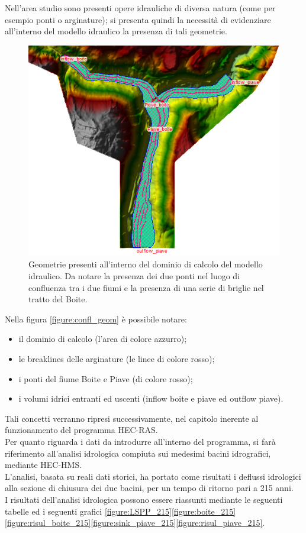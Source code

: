 Nell'area studio sono presenti opere idrauliche di diversa natura (come per esempio ponti o arginature); si presenta quindi la necessità di evidenziare all'interno del modello idraulico la presenza di tali geometrie.

\begin{figure}[H] \centering
\includegraphics[scale=0.7]{immagini/confl_geom.PNG}
\caption{Geometrie presenti all'interno del dominio di calcolo del modello idraulico. Da notare la presenza dei due ponti nel luogo di confluenza tra i due fiumi e la presenza di una serie di briglie nel tratto del Boite.}
\label{figure:confl_geom}    
\end{figure}
Nella figura \eqref{figure:confl_geom} è possibile notare:
\begin{itemize}
    \item il dominio di calcolo (l'area di colore azzurro);
    \item le breaklines delle arginature (le linee di colore rosso);
    \item i ponti del fiume Boite e Piave (di colore rosso);
    \item i volumi idrici entranti ed uscenti (inflow boite e piave ed outflow piave).
\end{itemize}
Tali concetti verranno ripresi successivamente, nel capitolo inerente al funzionamento del programma HEC-RAS.\\
Per quanto riguarda i dati da introdurre all'interno del programma, si farà riferimento all'analisi idrologica compiuta sui medesimi bacini idrografici, mediante HEC-HMS.\\
L'analisi, basata su reali dati storici, ha portato come risultati i deflussi idrologici alla sezione di chiusura dei due bacini, per un tempo di ritorno pari a 215 anni.\\
I risultati dell'analisi idrologica possono essere riassunti mediante le seguenti tabelle ed i seguenti grafici \eqref{figure:LSPP_215}\eqref{figure:boite_215}\eqref{figure:risul_boite_215}\eqref{figure:sink_piave_215}\eqref{figure:risul_piave_215}.


